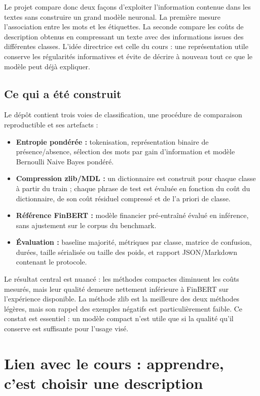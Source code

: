 \documentclass[11pt,a4paper]{article}
\begin{document}
Le projet compare donc deux façons d'exploiter l'information contenue dans
les textes sans construire un grand modèle neuronal. La première mesure
l'association entre les mots et les étiquettes. La seconde compare les coûts
de description obtenus en compressant un texte avec des informations issues
des différentes classes. L'idée directrice est celle du cours :
une représentation utile conserve les régularités informatives et évite de
décrire à nouveau tout ce que le modèle peut déjà expliquer.

\subsection{Ce qui a été construit}
Le dépôt contient trois voies de classification, une procédure de comparaison
reproductible et ses artefacts :
\begin{itemize}
  \item \textbf{Entropie pondérée :} tokenisation, représentation binaire de
  présence/absence, sélection des mots par gain d'information et modèle
  Bernoulli Naive Bayes pondéré.
  \item \textbf{Compression zlib/MDL :} un dictionnaire est construit pour
  chaque classe à partir du train ; chaque phrase de test est évaluée en
  fonction du coût du dictionnaire, de son coût résiduel compressé et de
  l'a priori de classe.
  \item \textbf{Référence FinBERT :} modèle financier pré-entraîné évalué en
  inférence, sans ajustement sur le corpus du benchmark.
  \item \textbf{Évaluation :} baseline majorité, métriques par classe,
  matrice de confusion, durées, taille sérialisée ou taille des poids, et
  rapport JSON/Markdown contenant le protocole.
\end{itemize}

Le résultat central est nuancé : les méthodes compactes diminuent les coûts
mesurés, mais leur qualité demeure nettement inférieure à FinBERT sur
l'expérience disponible. La méthode zlib est la meilleure des deux méthodes
légères, mais son rappel des exemples négatifs est particulièrement faible.
Ce constat est essentiel : un modèle compact n'est utile que si la qualité
qu'il conserve est suffisante pour l'usage visé.

\section{Lien avec le cours : apprendre, c'est choisir une description}
\end{document}

